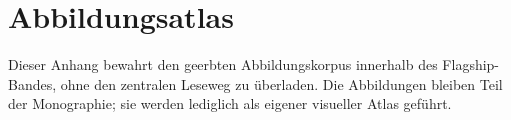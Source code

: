 \section{Abbildungsatlas}
\label{sec:oc-core-1-3-figure-atlas}

Dieser Anhang bewahrt den geerbten Abbildungskorpus innerhalb des
Flagship-Bandes, ohne den zentralen Leseweg zu überladen. Die Abbildungen
bleiben Teil der Monographie; sie werden lediglich als eigener visueller Atlas
geführt.

\begingroup
\let\ocappendixsection\section
\let\ocappendixsubsection\subsection
\let\ocappendixsubsubsection\subsubsection
\renewcommand{\section}{\ocappendixsubsection}
\renewcommand{\subsection}{\ocappendixsubsubsection}

\endgroup
